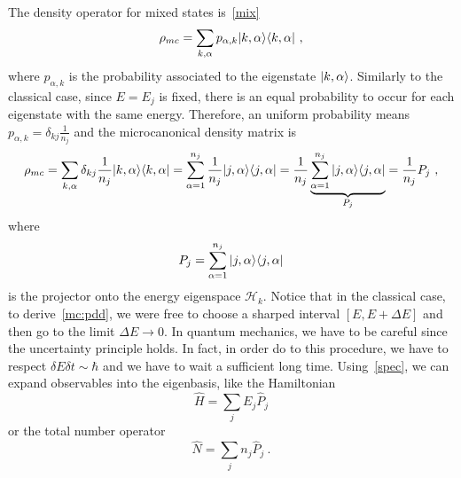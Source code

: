     The density operator for mixed states is~\eqref{mix}
    \begin{equation*}
        \rho_{mc} = \sum_{k, \alpha} p_{\alpha, k} \vert k, \alpha\rangle \langle k, \alpha\vert ~,
    \end{equation*}
    where $p_{\alpha, k}$ is the probability associated to the eigenstate $\vert k, \alpha\rangle$. 
    Similarly to the classical case, since $E = E_j$ is fixed, there is an equal probability to occur for each eigenstate with the same energy. Therefore, an uniform probability means $p_{\alpha, k} = \delta_{k j} \frac{1}{n_j}$ and the microcanonical density matrix is
    \begin{equation*}
        \rho_{mc} = \sum_{k, \alpha} \delta_{k j} \frac{1}{n_j} \vert k, \alpha\rangle \langle k, \alpha\vert = \sum_{\alpha = 1}^{n_j} \frac{1}{n_j} \vert j, \alpha\rangle \langle j, \alpha\vert =  \frac{1}{n_j} \underbrace{ \sum_{\alpha = 1}^{n_j} \vert j, \alpha\rangle \langle j, \alpha\vert}_{P_j} = \frac{1}{n_j} P_j ~,
    \end{equation*}
    where 
    \begin{equation*}
        P_j = \sum_{\alpha=1}^{n_j} \vert j, \alpha\rangle \langle j, \alpha\vert
    \end{equation*} 
    is the projector onto the energy eigenspace $\mathcal H_k$. 
    Notice that in the classical case, to derive~\eqref{mc:pdd}, we were free to choose a sharped interval $[E, E + \Delta E]$ and then go to the limit $\Delta E \rightarrow 0$. In quantum mechanics, we have to be careful since the uncertainty principle holds. In fact, in order do to this procedure, we have to respect $\delta E \delta t \sim \hbar$ and we have to wait a sufficient long time.
    Using~\eqref{spec}, we can expand observables into the eigenbasis, like the Hamiltonian
    \begin{equation}\label{endec}
        \hat H = \sum_j E_j \hat P_j 
    \end{equation}
    or the total number operator 
    \begin{equation}\label{numb}
        \hat N = \sum_j n_j \hat P_j ~.
    \end{equation}

